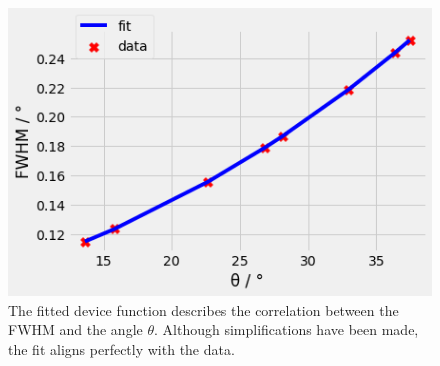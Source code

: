 \begin{figure}[ht]
    \centering
    \includegraphics[width = 0.8\linewidth]{Bilder/Auswertung/NaCl/deviceFct.png}
    \caption{The fitted device function describes the correlation between the FWHM and the angle $\theta$. Although simplifications have been made, the fit aligns perfectly with the data.}
    \label{fig:devFct}
\end{figure}

